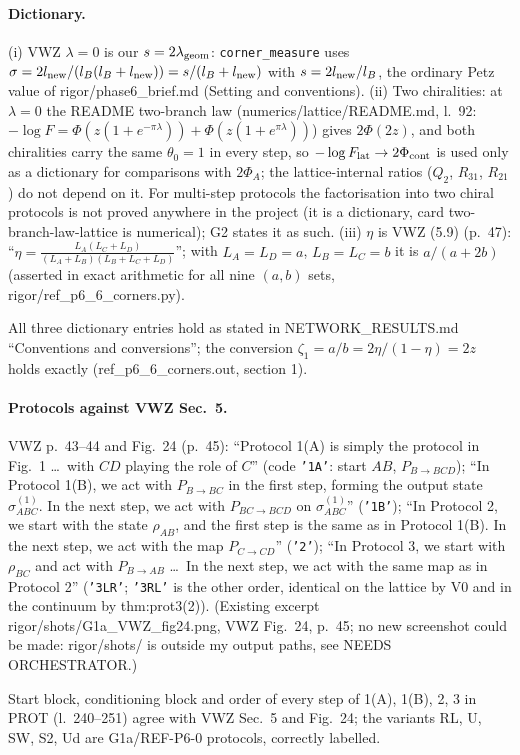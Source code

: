 \documentclass[11pt]{article}
\begin{document}
\paragraph{Dictionary.} (i) VWZ $\lambda=0$ is our $s=2\lambda_{\rm geom}$: \texttt{corner\_measure} uses
$\sigma=2l_{\rm new}/(l_B(l_B+l_{\rm new}))=s/(l_B+l_{\rm new})$ with $s=2l_{\rm new}/l_B$, the ordinary Petz value
of rigor/phase6\_brief.md (Setting and conventions). (ii) Two chiralities: at $\lambda=0$ the README two-branch law
(numerics/lattice/README.md, l.~92: $-\log F=\Phi(z(1+e^{-\pi\lambda}))+\Phi(z(1+e^{\pi\lambda}))$) gives
$2\Phi(2z)$, and both chiralities carry the same $\theta_0=1$ in every step, so $-\log F_{\rm lat}\to2\Phi_{\rm cont}$
is used only as a dictionary for comparisons with $2\Phi_A$; the lattice-internal ratios ($Q_2$, $R_{31}$,
$R_{21}$) do not depend on it. For multi-step protocols the factorisation into two chiral protocols is not proved
anywhere in the project (it is a dictionary, card two-branch-law-lattice is numerical); G2 states it as such.
(iii) $\eta$ is VWZ (5.9) (p.~47): ``$\eta=\frac{L_A(L_C+L_D)}{(L_A+L_B)(L_B+L_C+L_D)}$''; with $L_A=L_D=a$,
$L_B=L_C=b$ it is $a/(a+2b)$ (asserted in exact arithmetic for all nine $(a,b)$ sets, rigor/ref\_p6\_6\_corners.py).
\begin{verdictok}
All three dictionary entries hold as stated in NETWORK\_RESULTS.md ``Conventions and conversions''; the conversion
$\zeta_1=a/b=2\eta/(1-\eta)=2z$ holds exactly (ref\_p6\_6\_corners.out, section 1).
\end{verdictok}

\paragraph{Protocols against VWZ Sec.~5.} VWZ p.~43--44 and Fig.~24 (p.~45):
``Protocol 1(A) is simply the protocol in Fig.~1 \ldots\ with $CD$ playing the role of $C$'' (code \texttt{'1A'}: start
$AB$, $P_{B\to BCD}$); ``In Protocol 1(B), we act with $P_{B\to BC}$ in the first step, forming the output state
$\sigma^{(1)}_{ABC}$. In the next step, we act with $P_{BC\to BCD}$ on $\sigma^{(1)}_{ABC}$'' (\texttt{'1B'});
``In Protocol 2, we start with the state $\rho_{AB}$, and the first step is the same as in Protocol 1(B). In the next
step, we act with the map $P_{C\to CD}$'' (\texttt{'2'}); ``In Protocol 3, we start with $\rho_{BC}$ and act with
$P_{B\to AB}$ \ldots\ In the next step, we act with the same map as in Protocol 2'' (\texttt{'3LR'}; \texttt{'3RL'} is
the other order, identical on the lattice by V0 and in the continuum by thm:prot3(2)).
\noindent(Existing excerpt rigor/shots/G1a\_VWZ\_fig24.png, VWZ Fig.~24, p.~45; no new screenshot could be made:
rigor/shots/ is outside my output paths, see NEEDS ORCHESTRATOR.)
\begin{verdictok}
Start block, conditioning block and order of every step of 1(A), 1(B), 2, 3 in PROT (l.~240--251) agree with
VWZ Sec.~5 and Fig.~24; the variants RL, U, SW, S2, Ud are G1a/REF-P6-0 protocols, correctly labelled.
\end{verdictok}
\end{document}
